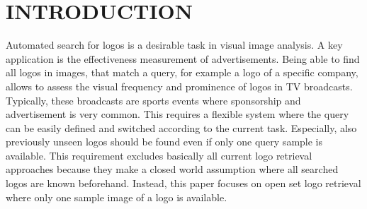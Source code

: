 \documentclass[a4paper,twoside]{article}
\begin{document}
\section{\uppercase{Introduction}}
\label{sec:introduction}
%
%
%
\noindent Automated search for logos is a desirable task in visual image analysis.
A key application is the effectiveness measurement of advertisements. Being able to find all logos in images, that match a query, for example a logo of a specific company, allows to assess the visual frequency and prominence of logos in TV broadcasts. Typically, these broadcasts are sports events where sponsorship and advertisement is very common. 
This requires a flexible system where the query can be easily defined and switched according to the current task. Especially, also previously unseen logos should be found even if only one query sample is available.
This requirement excludes basically all current logo retrieval approaches because they make a closed world assumption where all searched logos are known beforehand. Instead, this paper focuses on open set logo retrieval where only one sample image of a logo is available. 
\end{document}
